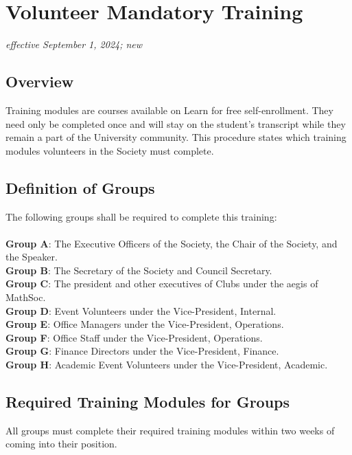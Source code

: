 \section{Volunteer Mandatory Training}
\emph{effective September 1, 2024; new}\\

\subsection{Overview}

Training modules are courses available on Learn for free self-enrollment. They need only be
completed once and will stay on the student's transcript while they remain a part of the
University community. This procedure states which training modules volunteers in the
Society must complete.

\subsection{Definition of Groups}

The following groups shall be required to complete this training: \\
\\ \textbf{Group A}: The Executive Officers of the Society, the Chair of the Society, and the Speaker.
\\ \textbf{Group B}: The Secretary of the Society and Council Secretary.
\\ \textbf{Group C}: The president and other executives of Clubs under the aegis of MathSoc.
\\ \textbf{Group D}: Event Volunteers under the Vice-President, Internal.
\\ \textbf{Group E}: Office Managers under the Vice-President, Operations.
\\ \textbf{Group F}: Office Staff under the Vice-President, Operations.
\\ \textbf{Group G}: Finance Directors under the Vice-President, Finance.
\\ \textbf{Group H}: Academic Event Volunteers under the Vice-President, Academic.

\subsection{Required Training Modules for Groups}

All groups must complete their required training modules within two weeks of coming into their
position.

